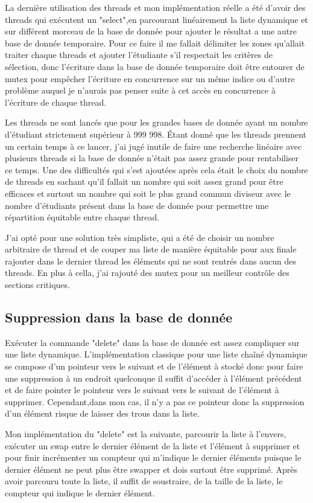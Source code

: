 \documentclass[a4paper, 12pt]{article}
\begin{document}
La dernière utilisation des threads et mon implémentation réelle a été d'avoir des threads qui exécutent un "select",en parcourant linéairement la liste dynamique et sur différent morceau de la base de donnée pour ajouter le résultat a une autre base de donnée temporaire. Pour ce faire il me fallait délimiter les zones qu'allait traiter 
chaque threads et ajouter l’étudiante s'il respectait les critères de sélection, donc l’écriture dans la base de donnée temporaire doit être entourer
de mutex pour empêcher l’écriture en concurrence sur un même indice ou d'autre problème auquel je n'aurais 
pas penser suite à cet accès en concurrence à l’écriture de chaque thread.

Les threads ne sont lancés que pour les grandes bases de donnée ayant un nombre d’étudiant strictement supérieur à 999 998. Étant donné que les threads prennent un certain temps à ce lancer, j'ai jugé inutile de faire une recherche linéaire avec plusieurs threads si la base de donnée n’était pas assez grande pour rentabiliser ce temps. Une des difficultés qui s'est ajoutées après cela était le choix
du nombre de threads en sachant qu'il fallait un nombre qui soit assez grand pour être efficaces et surtout un nombre qui soit le plus grand commun diviseur avec le nombre 
d’étudiants présent dans la base de donnée  pour permettre une répartition équitable entre chaque thread. 

J'ai opté pour une solution très simpliste, qui a été de choisir un nombre arbitraire de thread et de couper ma liste de manière équitable pour aux finale rajouter dans le dernier thread les éléments qui ne sont rentrés dans aucun des threads. En plus à cella, j'ai rajouté des mutex pour un meilleur contrôle des sections critiques.


	\subsection{Suppression dans la base de donnée}

Exécuter la commande "delete" dans la base de donnée est assez compliquer sur une liste dynamique. L’implémentation classique pour une liste chaîné dynamique se compose d'un pointeur vers le
suivant et de l'élément à stocké donc pour faire une suppression à un endroit quelconque il suffit d’accéder à l’élément précédent et de faire pointer le pointeur vers le suivant vers le suivant de l’élément à supprimer. Cependant,dans mon cas, il n'y a pas ce pointeur donc la suppression d'un élément risque de laisser des trous dans la liste.

Mon implémentation du "delete" est la suivante, parcourir la liste à l'envers, exécuter un swap entre le dernier élément de la liste et l’élément à supprimer et pour finir incrémenter un compteur qui m'indique le dernier éléments puisque le dernier élément ne peut plus être swapper et dois surtout être supprimé.
Après avoir parcouru toute la liste, il suffit de soustraire, de la taille de la liste, le compteur qui indique le dernier élément.
\end{document}
